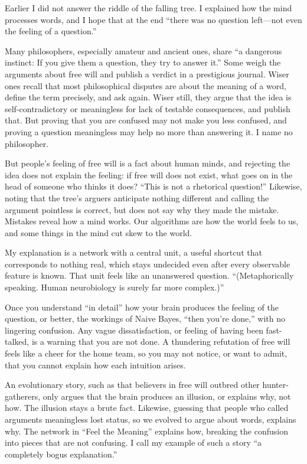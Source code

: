 
Earlier I did not answer the riddle of the falling tree. I explained how the mind processes words, and I hope that at the end ``there was no question left---not even the feeling of a question.''

Many philosophers, especially amateur and ancient ones, share ``a dangerous instinct: If you give them a question, they try to answer it.'' Some weigh the arguments about free will and publish a verdict in a prestigious journal. Wiser ones recall that most philosophical disputes are about the meaning of a word, define the term precisely, and ask again. Wiser still, they argue that the idea is self-contradictory or meaningless for lack of testable consequences, and publish that. But proving that you are confused may not make you less confused, and proving a question meaningless may help no more than answering it. I name no philosopher. 

But people's feeling of free will is a fact about human minds, and rejecting the idea does not explain the feeling: if free will does not exist, what goes on in the head of someone who thinks it does? ``This is not a rhetorical question!'' Likewise, noting that the tree's arguers anticipate nothing different and calling the argument pointless is correct, but does not say why they made the mistake. Mistakes reveal how a mind works. Our algorithms are how the world feels to us, and some things in the mind cut skew to the world.

My explanation is a network with a central unit, a useful shortcut that corresponds to nothing real, which stays undecided even after every observable feature is known. That unit feels like an unanswered question. ``(Metaphorically speaking. Human neurobiology is surely far more complex.)''

Once you understand ``in detail'' how your brain produces the feeling of the question, or better, the workings of Naive Bayes, ``then you're done,'' with no lingering confusion. Any vague dissatisfaction, or feeling of having been fast-talked, is a warning that you are not done. A thundering refutation of free will feels like a cheer for the home team, so you may not notice, or want to admit, that you cannot explain how each intuition arises.

An evolutionary story, such as that believers in free will outbred other hunter-gatherers, only argues that the brain produces an illusion, or explains why, not how. The illusion stays a brute fact. Likewise, guessing that people who called arguments meaningless lost status, so we evolved to argue about words, explains why. The network in ``Feel the Meaning'' explains how, breaking the confusion into pieces that are not confusing. I call my example of such a story ``a completely bogus explanation.'' 

